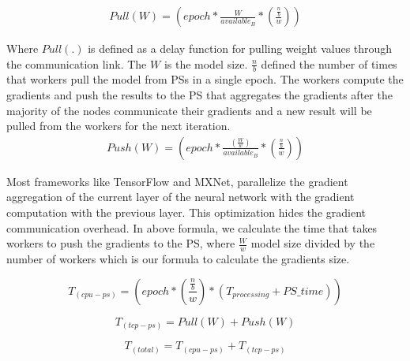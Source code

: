 \documentclass[conference]{IEEEtran}
\begin{document}
\begin{equation} \label{eq:data}
\begin{split}
Pull(W) = (epoch * \frac{W}{available_{B}} * (\frac{\frac{n}{b}}{w}))
\end{split}
\end{equation}

Where $Pull(.)$ is defined as a delay function for pulling weight values through the communication link. The $W$ is the model size. $\frac{n}{b}$ defined the number of times that workers pull the model from PSs in a single epoch. The workers compute the gradients and push the results to the PS that aggregates the gradients after the majority of the nodes communicate their gradients and a new result will be pulled from the workers for the next iteration. 
\begin{equation} \label{eq:data1}
\begin{split}
Push(W) = (epoch * \frac{(\frac{W}{w})}{available_{B}} * (\frac{\frac{n}{b}}{w}))
\end{split}
\end{equation}

Most frameworks like TensorFlow and MXNet, parallelize the gradient aggregation of the current layer of the neural network with the gradient computation with the previous layer. This optimization hides the gradient communication overhead. In above formula, we calculate the time that takes workers to push the gradients to the PS, where $\frac{W}{w}$ model size divided by the number of workers which is our formula to calculate the gradients size.  

\begin{equation}
T_{(cpu-ps)} = (epoch* (\frac{\frac{n}{b}}{w}) * (T_{processing}+ PS\_time))
\end{equation}

\begin{equation}
T_{(tcp-ps)}  = Pull(W) + Push(W)
\end{equation}

\begin{equation}
T_{(total)}  = T_{(cpu-ps)}  + T_{(tcp-ps)} 
\end{equation}
\end{document}
